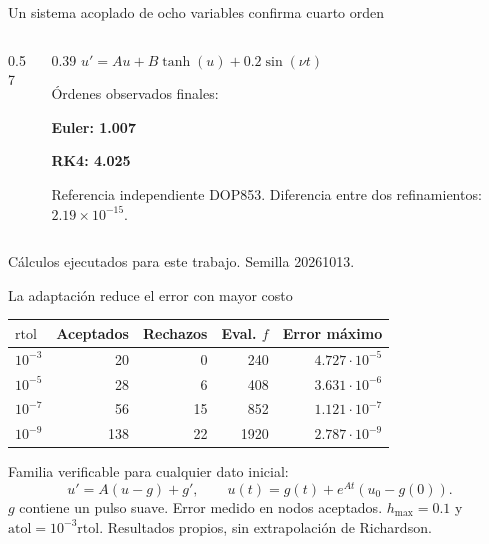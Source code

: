 \documentclass[aspectratio=169,11pt]{beamer}
\newcommand{\source}[1]{\vfill{\tiny\color{graytext}#1}}
\begin{document}
\begin{frame}{Un sistema acoplado de ocho variables confirma cuarto orden}
\begin{columns}
\begin{column}{0.57\textwidth}
\end{column}
\begin{column}{0.39\textwidth}
\small
$u'=Au+B\tanh(u)+0.2\sin(\nu t)$\par\vspace{0.3cm}
Órdenes observados finales:\par
\textbf{Euler: 1.007}\par
\textbf{RK4: 4.025}\par\vspace{0.3cm}
Referencia independiente DOP853. Diferencia entre dos refinamientos:
$2.19\times10^{-15}$.
\end{column}
\end{columns}
\source{Cálculos ejecutados para este trabajo. Semilla 20261013.}
\end{frame}

\begin{frame}{La adaptación reduce el error con mayor costo}
\small\renewcommand{\arraystretch}{1.3}
\begin{tabularx}{0.98\linewidth}{@{}lrrrr@{}}\toprule
$\mathrm{rtol}$ & Aceptados & Rechazos & Eval. $f$ & Error máximo\\\midrule
$10^{-3}$ & 20 & 0 & 240 & $4.727\cdot10^{-5}$\\
$10^{-5}$ & 28 & 6 & 408 & $3.631\cdot10^{-6}$\\
$10^{-7}$ & 56 & 15 & 852 & $1.121\cdot10^{-7}$\\
$10^{-9}$ & 138 & 22 & 1920 & $2.787\cdot10^{-9}$\\\bottomrule
\end{tabularx}\par
\vspace{0.35cm}
Familia verificable para cualquier dato inicial:
\[
u'=A(u-g)+g',\qquad u(t)=g(t)+e^{At}(u_0-g(0)).
\]
\small $g$ contiene un pulso suave. Error medido en nodos aceptados.
$h_{\max}=0.1$ y $\mathrm{atol}=10^{-3}\mathrm{rtol}$.
\source{Resultados propios, sin extrapolación de Richardson.}
\end{frame}
\end{document}
